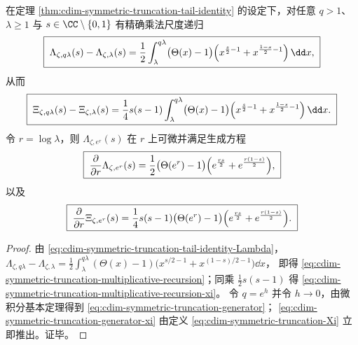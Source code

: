 \begin{corollary}[乘法尺度递归律与生成算子]\label{cor:cdim-symmetric-truncation-multiplicative-recursion-generator}
在定理 \ref{thm:cdim-symmetric-truncation-tail-identity} 的设定下，对任意 \(q>1\)、\(\lambda\ge 1\) 与 \(s\in\CC\setminus\{0,1\}\) 有精确乘法尺度递归
\begin{equation}\label{eq:cdim-symmetric-truncation-multiplicative-recursion}
\boxed{\;
\Lambda_{\zeta,q\lambda}(s)-\Lambda_{\zeta,\lambda}(s)
=\frac12\int_{\lambda}^{q\lambda}\bigl(\Theta(x)-1\bigr)
\Bigl(x^{\frac{s}{2}-1}+x^{\frac{1-s}{2}-1}\Bigr)\,\dd x,\;}
\end{equation}
从而
\begin{equation}\label{eq:cdim-symmetric-truncation-multiplicative-recursion-xi}
\boxed{\;
\Xi_{\zeta,q\lambda}(s)-\Xi_{\zeta,\lambda}(s)
=\frac14 s(s-1)\int_{\lambda}^{q\lambda}\bigl(\Theta(x)-1\bigr)
\Bigl(x^{\frac{s}{2}-1}+x^{\frac{1-s}{2}-1}\Bigr)\,\dd x.\;}
\end{equation}
令 \(r=\log\lambda\)，则 \(\Lambda_{\zeta,e^r}(s)\) 在 \(r\) 上可微并满足生成方程
\begin{equation}\label{eq:cdim-symmetric-truncation-generator}
\boxed{\;
\frac{\partial}{\partial r}\Lambda_{\zeta,e^r}(s)
=\frac12\bigl(\Theta(e^r)-1\bigr)\Bigl(e^{\frac{rs}{2}}+e^{\frac{r(1-s)}{2}}\Bigr),\;}
\end{equation}
以及
\begin{equation}\label{eq:cdim-symmetric-truncation-generator-xi}
\boxed{\;
\frac{\partial}{\partial r}\Xi_{\zeta,e^r}(s)
=\frac14 s(s-1)\bigl(\Theta(e^r)-1\bigr)\Bigl(e^{\frac{rs}{2}}+e^{\frac{r(1-s)}{2}}\Bigr).\;}
\end{equation}
\end{corollary}
\begin{proof}
由 \eqref{eq:cdim-symmetric-truncation-tail-identity-Lambda}，
\(
\Lambda_{\zeta,q\lambda}-\Lambda_{\zeta,\lambda}
=\frac12\int_{\lambda}^{q\lambda}(\Theta(x)-1)\bigl(x^{s/2-1}+x^{(1-s)/2-1}\bigr)\dd x
\)，
即得 \eqref{eq:cdim-symmetric-truncation-multiplicative-recursion}；同乘 \(\tfrac12 s(s-1)\) 得 \eqref{eq:cdim-symmetric-truncation-multiplicative-recursion-xi}。
令 \(q=e^h\) 并令 \(h\to 0\)，由微积分基本定理得到 \eqref{eq:cdim-symmetric-truncation-generator}；
\eqref{eq:cdim-symmetric-truncation-generator-xi} 由定义 \eqref{eq:cdim-symmetric-truncation-Xi} 立即推出。证毕。
\end{proof}

